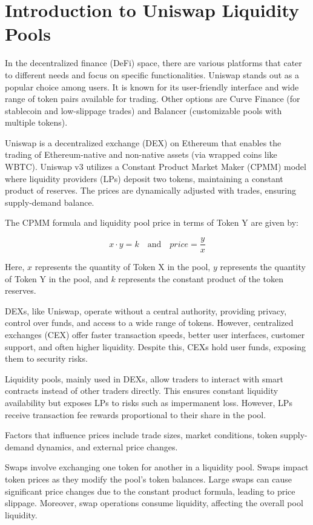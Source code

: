 \documentclass{article}
\begin{document}
{\section*{\textbf{Introduction to Uniswap Liquidity Pools}}

In the decentralized finance (DeFi) space, there are various platforms that cater to different needs and focus on specific functionalities. Uniswap stands out as a popular choice among users. It is known for its user-friendly interface and wide range of token pairs available for trading. Other options are Curve Finance (for stablecoin and low-slippage trades) and Balancer (customizable pools with multiple tokens).

Uniswap is a decentralized exchange (DEX) on Ethereum that enables the trading of Ethereum-native and non-native assets (via wrapped coins like WBTC). Uniswap v3 utilizes a Constant Product Market Maker (CPMM) model where liquidity providers (LPs) deposit two tokens, maintaining a constant product of reserves. The prices are dynamically adjusted with trades, ensuring supply-demand balance.

The CPMM formula and liquidity pool price in terms of Token Y are given by:

\[x \cdot y = k \quad \text{and} \quad price = \frac{y}{x}\]

Here, \(x\) represents the quantity of Token X in the pool, \(y\) represents the quantity of Token Y in the pool, and \(k\) represents the constant product of the token reserves.

DEXs, like Uniswap, operate without a central authority, providing privacy, control over funds, and access to a wide range of tokens. However, centralized exchanges (CEX) offer faster transaction speeds, better user interfaces, customer support, and often higher liquidity. Despite this, CEXs hold user funds, exposing them to security risks.

Liquidity pools, mainly used in DEXs, allow traders to interact with smart contracts instead of other traders directly. This ensures constant liquidity availability but exposes LPs to risks such as impermanent loss. However, LPs receive transaction fee rewards proportional to their share in the pool.


Factors that influence prices include trade sizes, market conditions, token supply-demand dynamics, and external price changes.

Swaps involve exchanging one token for another in a liquidity pool. Swaps impact token prices as they modify the pool's token balances. Large swaps can cause significant price changes due to the constant product formula, leading to price slippage. Moreover, swap operations consume liquidity, affecting the overall pool liquidity.

}
\end{document}

